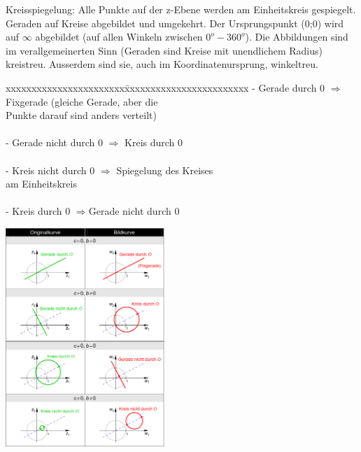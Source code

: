 	\begin{minipage}{9cm}
		Kreisspiegelung: Alle Punkte auf der z-Ebene werden am Einheitskreis gespiegelt.
		Geraden auf Kreise abgebildet und umgekehrt. Der Ursprungspunkt (0;0) wird auf
		$ \infty $ abgebildet (auf allen Winkeln zwischen $0^o-360^o$). Die
		Abbildungen sind im verallgemeinerten Sinn (Geraden sind Kreise mit unendlichem Radius)
		kreistreu. Ausserdem sind sie, auch im Koordinatenursprung, winkeltreu.\\
		\begin{tabbing}
        	xxxxxxxxxxxxxxxxxxxxxxx\=xxxxxxxxxxxxxxxxxxxxxxxx\kill
	        - Gerade durch 0 $\Longrightarrow$ \>Fixgerade (gleiche Gerade, aber
	        die \\ \>Punkte darauf sind anders verteilt)\\ \\
			- Gerade nicht durch 0 $\Longrightarrow$ Kreis durch 0\\ \\ 
			- Kreis nicht durch 0 $\Longrightarrow$ \>Spiegelung des Kreises\\ \> am Einheitskreis\\ \\
			- Kreis durch 0 $\Longrightarrow$\>Gerade nicht durch 0
        \end{tabbing}
	\end{minipage}
	\hspace{2cm}
	\begin{minipage}{6cm}
		\includegraphics[width=6cm]{./bilder/Kurvenspiegelung.png}
    \end{minipage}


